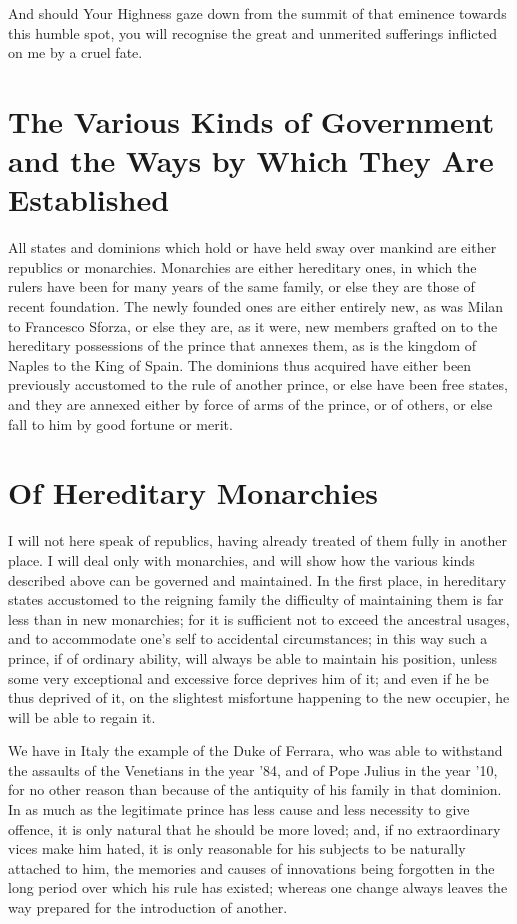 \documentclass[12pt,letterpaper]{memoir}
\begin{document}
And should Your Highness gaze down from the summit of that eminence
towards this humble spot, you will recognise the great and unmerited
sufferings inflicted on me by a cruel fate.

\mainmatter

\chapter{The Various Kinds of Government and the Ways by Which They Are Established}

All states and dominions which hold or have held sway over mankind are
either republics or monarchies. Monarchies are either hereditary ones,
in which the rulers have been for many years of the same family, or
else they are those of recent foundation. The newly founded ones are
either entirely new, as was Milan to Francesco Sforza, or else they
are, as it were, new members grafted on to the hereditary possessions
of the prince that annexes them, as is the kingdom of Naples to the
King of Spain. The dominions thus acquired have either been previously
accustomed to the rule of another prince, or else have been free
states, and they are annexed either by force of arms of the prince, or
of others, or else fall to him by good fortune or merit.

\chapter{Of Hereditary Monarchies}

I will not here speak of republics, having already treated of them
fully in another place. I will deal only with monarchies, and will show
how the various kinds described above can be governed and maintained.
In the first place, in hereditary states accustomed to the reigning
family the difficulty of maintaining them is far less than in new
monarchies; for it is sufficient not to exceed the ancestral usages,
and to accommodate one's self to accidental circumstances; in this way
such a prince, if of ordinary ability, will always be able to maintain
his position, unless some very exceptional and excessive force deprives
him of it; and even if he be thus deprived of it, on the slightest
misfortune happening to the new occupier, he will be able to regain it.

We have in Italy the example of the Duke of Ferrara, who was able
to withstand the assaults of the Venetians in the year '84, and of
Pope Julius in the year '10, for no other reason than because of the
antiquity of his family in that dominion. In as much as the legitimate
prince has less cause and less necessity to give offence, it is only
natural that he should be more loved; and, if no extraordinary vices
make him hated, it is only reasonable for his subjects to be naturally
attached to him, the memories and causes of innovations being forgotten
in the long period over which his rule has existed; whereas one change
always leaves the way prepared for the introduction of another.
\end{document}
